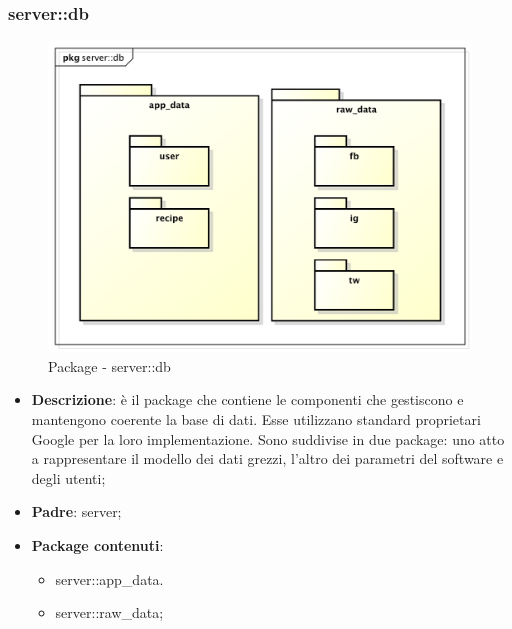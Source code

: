 

\subsubsection{server::db} %
\label{ssub:bdsm_app_server_db}
	\begin{figure}[htbp]
		\centering
		\centerline{\includegraphics[scale=0.5]{./images/server/db.pdf}}
		\caption{Package - server::db}
	\end{figure}
	\begin{itemize}
		\item \textbf{Descrizione}: è il package che contiene le componenti che gestiscono e mantengono coerente la base di dati. Esse utilizzano standard proprietari Google per la loro implementazione. Sono suddivise in due package: uno atto a rappresentare il modello dei dati grezzi, l'altro dei parametri del software e degli utenti;
		\item \textbf{Padre}: server;
		\item \textbf{Package contenuti}:
			\begin{itemize}
				\item server::app\_data.
				\item server::raw\_data;
			\end{itemize}
	\end{itemize}

